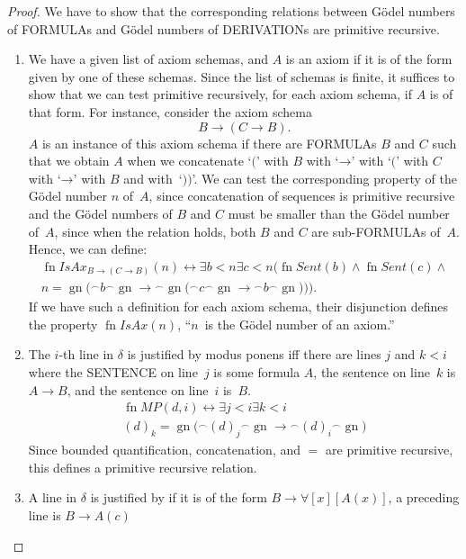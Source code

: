 \documentclass[10pt,a4paper]{article}
\newcommand*{\olup}[1]{\MakeUppercase{#1}}
\theoremstyle{plain}
\theoremstyle{definition}
\theoremstyle{remark}
\providecommand{\lif}{\mathbin{\rightarrow}}
\providecommand{\lforall}{\mathord{\forall}}
\providecommand{\concat}{\mathbin{{}^\frown}}
\providecommand{\Gn}{\operatorname{gn}}
\providecommand{\bexists}{\exists}
\providecommand{\QR}{\mathrm{QR}}
\providecommand{\defiff}{\mathrel{\leftrightarrow}}
\providecommand{\fn}{\operatorname{fn}}
\begin{document}
\begin{proof}
We have to show that the corresponding relations between G\"odel
numbers of \olup{formula}s and  G\"odel numbers of \olup{derivation}s 
are primitive recursive.
\begin{enumerate}
\item We have a given list of axiom schemas, and $A$ is an axiom if
  it is of the form given by one of these schemas.  Since the list of
  schemas is finite, it suffices to show that we can test primitive
  recursively, for each axiom schema, if $A$ is of that form. For
  instance, consider the axiom schema
  \[
  B \lif (C \lif B).
  \]
  $A$ is an instance of this axiom schema if there are \olup{formula}s
  $B$ and $C$ such that we obtain $A$ when we concatenate `$($'
  with $B$ with `$\lif$' with `$($' with $C$ with `$\lif$' with $B$
  and with~`$))$'. We can test the corresponding property of the
  G\"odel number $n$ of~$A$, since concatenation of sequences is
  primitive recursive and the G\"odel numbers of $B$ and $C$ must
  be smaller than the G\"odel number of~$A$, since when the relation
  holds, both $B$ and $C$ are sub-\olup{formula}s of~$A$. Hence, we
  can define:
  \begin{multline*}
  \fn{IsAx}_{B \lif (C \lif B)}(n) \defiff \bexists{b< n}{
    \bexists{c < n}{(\fn{Sent}(b) \land \fn{Sent}(c) \land {}}}\\ n =
  \Gn{(} \concat b \concat \Gn{\lif} \concat \Gn{(} \concat c \concat
  \Gn{\lif} \concat b \concat \Gn{))}).
  \end{multline*}
  If we have such a definition for each axiom schema, their
  disjunction defines the property $\fn{IsAx}(n)$, ``$n$~is the
  G\"odel number of an axiom.''
\item The $i$-th line in $\delta$ is justified by modus ponens iff there
  are lines $j$ and $k < i$ where the \olup{sentence} on line~$j$ is some
  formula $A$, the sentence on line~$k$ is $A \lif B$, and the
  sentence on line~$i$ is~$B$.
  \begin{multline*}
    \fn{MP}(d, i) \defiff \bexists{j < i}{\bexists{k < i}{}}\\
    (d)_k = \Gn{(} \concat (d)_j
      \concat \Gn{\lif} \concat (d)_i \concat \Gn{)}
  \end{multline*}
  Since bounded quantification, concatenation, and $=$ are primitive
  recursive, this defines a primitive recursive relation. 
\item A line in $\delta$ is justified by \QR{} if it is of the form
  $B \lif \lforall[x][A(x)]$, a preceding line is $B \lif A(c)$

\end{enumerate}
\end{proof}
\end{document}
